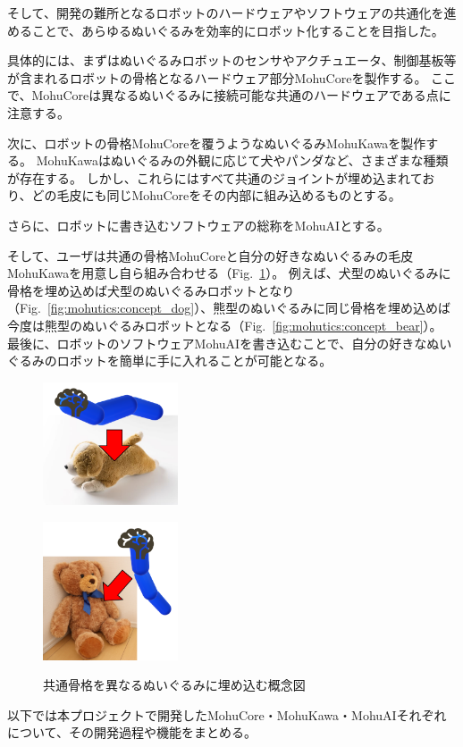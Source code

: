 \documentclass[uplatex,a4paper,12pt]{jsarticle}
\renewcommand{\figurename}{Fig.}
\newcommand{\figref}[1]{\figurename~\ref{#1}}
\begin{document}
そして、開発の難所となるロボットのハードウェアやソフトウェアの共通化を進めることで、あらゆるぬいぐるみを効率的にロボット化することを目指した。

具体的には、まずはぬいぐるみロボットのセンサやアクチュエータ、制御基板等が含まれるロボットの骨格となるハードウェア部分MohuCoreを製作する。
ここで、MohuCoreは異なるぬいぐるみに接続可能な共通のハードウェアである点に注意する。

次に、ロボットの骨格MohuCoreを覆うようなぬいぐるみMohuKawaを製作する。
MohuKawaはぬいぐるみの外観に応じて犬やパンダなど、さまざまな種類が存在する。
しかし、これらにはすべて共通のジョイントが埋め込まれており、どの毛皮にも同じMohuCoreをその内部に組み込めるものとする。

さらに、ロボットに書き込むソフトウェアの総称をMohuAIとする。

そして、ユーザは共通の骨格MohuCoreと自分の好きなぬいぐるみの毛皮MohuKawaを用意し自ら組み合わせる（\figref{fig:mohutics:concept_embed}）。
例えば、犬型のぬいぐるみに骨格を埋め込めば犬型のぬいぐるみロボットとなり（\figref{fig:mohutics:concept_dog}）、熊型のぬいぐるみに同じ骨格を埋め込めば今度は熊型のぬいぐるみロボットとなる（\figref{fig:mohutics:concept_bear}）。
最後に、ロボットのソフトウェアMohuAIを書き込むことで、自分の好きなぬいぐるみのロボットを簡単に手に入れることが可能となる。
\begin{figure}[htbp]
  \centering
  \begin{minipage}[c]{0.48\linewidth}
    \centering
    \includegraphics[keepaspectratio,width=4cm,clip]{images/mohutics/concept_dog.png}
    \label{fig:mohutics:concept_dog}
  \end{minipage}
  \begin{minipage}[c]{0.48\linewidth}
    \centering
    \includegraphics[keepaspectratio,width=4cm,clip]{images/mohutics/concept_bear.png}
    \label{fig:mohutics:concept_bear}
  \end{minipage}
  \caption{共通骨格を異なるぬいぐるみに埋め込む概念図}
  \label{fig:mohutics:concept_embed}
\end{figure}
以下では本プロジェクトで開発したMohuCore・MohuKawa・MohuAIそれぞれについて、その開発過程や機能をまとめる。
\end{document}
